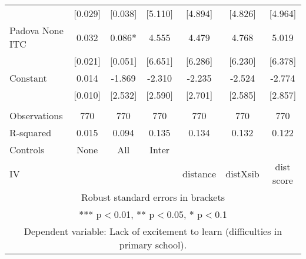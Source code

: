 \begin{tabular}{lcccccc}
 & [0.029] & [0.038] & [5.110] & [4.894] & [4.826] & [4.964] \\
Padova None ITC & 0.032 & 0.086* & 4.555 & 4.479 & 4.768 & 5.019 \\
 & [0.021] & [0.051] & [6.651] & [6.286] & [6.230] & [6.378] \\
Constant & 0.014 & -1.869 & -2.310 & -2.235 & -2.524 & -2.774 \\
 & [0.010] & [2.532] & [2.590] & [2.701] & [2.585] & [2.857] \\
 &  &  &  &  &  &  \\
Observations & 770 & 770 & 770 & 770 & 770 & 770 \\
R-squared & 0.015 & 0.094 & 0.135 & 0.134 & 0.132 & 0.122 \\
Controls & None & All & Inter &  &  &  \\
 IV &  &  &  & distance & distXsib & dist score \\ \hline
\multicolumn{7}{c}{ Robust standard errors in brackets} \\
\multicolumn{7}{c}{ *** p$<$0.01, ** p$<$0.05, * p$<$0.1} \\
\multicolumn{7}{c}{ Dependent variable: Lack of excitement to learn (difficulties in primary school).} \\
\end{tabular}
